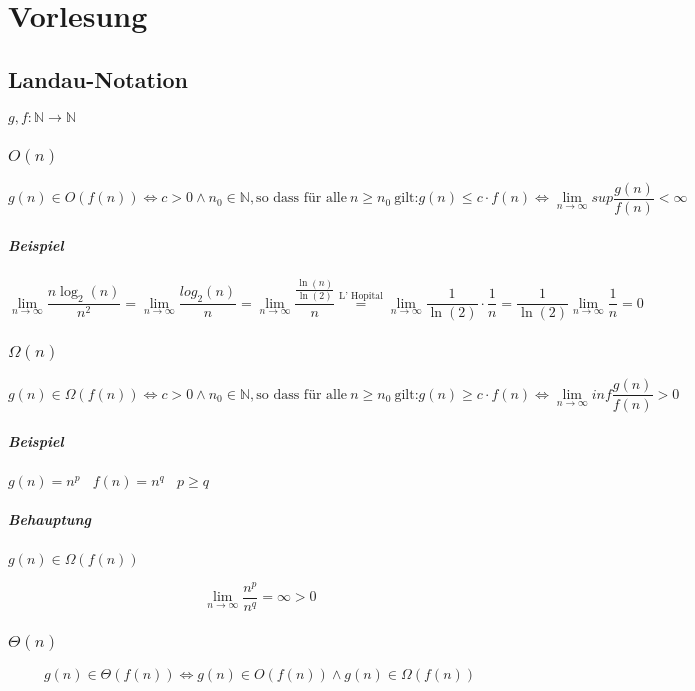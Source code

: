 \chapter{Vorlesung}


\section{Landau-Notation}

$g, f : \mathbb{N} \rightarrow \mathbb{N}$

\subsection{$O(n)$}
\[g(n) \in O(f(n)) \Leftrightarrow c > 0 \land n_0 \in \mathbb{N}, \text{so dass für alle}~n \geq n_0~\text{gilt:} g(n) \leq c \cdot f(n) \Leftrightarrow \lim\limits_{n \rightarrow \infty}{sup \frac{g(n)}{f(n)}} < \infty\]
\paragraph{Beispiel}
\[\lim\limits_{n \rightarrow \infty}{\frac{n \log_2(n)}{n^2}} = \lim\limits_{n \rightarrow \infty}{\frac{log_2(n)}{n}} = \lim\limits_{n \rightarrow \infty} {\frac{\frac{\ln(n)}{\ln(2)}}{n}} \stackrel{\text{L' Hopital}}{=} \lim\limits_{n \rightarrow \infty}{\frac{1}{\ln(2)} \cdot \frac{1}{n}} = \frac{1}{\ln(2)} \lim\limits_{n \rightarrow \infty}{\frac{1}{n} = 0}
\]


\subsection{$\Omega(n)$}
\[g(n) \in \Omega(f(n)) \Leftrightarrow c > 0 \land n_0 \in \mathbb{N}, \text{so dass für alle}~n \geq n_0~\text{gilt:} g(n) \geq c \cdot f(n) \Leftrightarrow \lim\limits_{n \rightarrow \infty}{inf \frac{g(n)}{f(n)}} > 0\]
\paragraph{Beispiel} $g(n) = n^p~~~~f(n)=n^q~~~~p \geq q$
\paragraph{Behauptung} $g(n) \in \Omega(f(n))$

\[\lim\limits_{n \rightarrow \infty}{\frac{n^p}{n^q}} = \infty > 0\]


\subsection{$\Theta(n)$}
\[g(n) \in \Theta(f(n)) \Leftrightarrow g(n) \in O(f(n)) \land g(n) \in \Omega(f(n))\]
